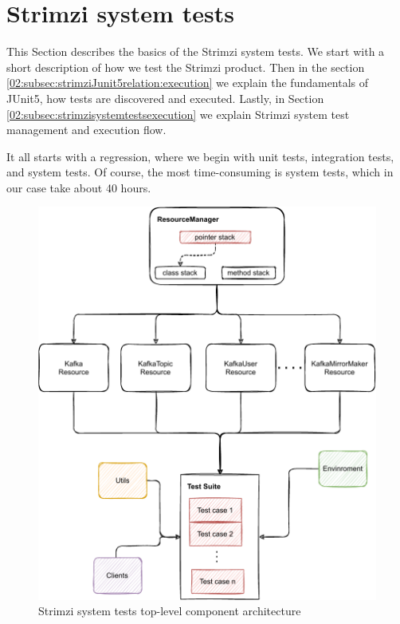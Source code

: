 \section{Strimzi system tests}
\label{02:sec:strimzisystemtests}

This Section describes the basics of the Strimzi system tests.
We start with a short description of how we test the Strimzi product.
Then in the section \ref{02:subsec:strimziJunit5relation:execution} we explain the fundamentals of JUnit5, how tests are discovered and executed. Lastly, in Section \ref{02:subsec:strimzisystemtestsexecution} we explain Strimzi system test management and execution flow. 

It all starts with a regression, where we begin with unit tests, integration tests, and system tests. Of course, the most time-consuming is system tests, which in our case take about 40 hours. 
\begin{figure}[!ht]
    \centering
    \includegraphics[scale=0.80]{obrazky-figures/02-preliminaries/04-strimzi-system-tests/01-architecture-overall.pdf}
    \caption{Strimzi system tests top-level component architecture}
    \label{02d:fig:strimzisystemtestarch}
\end{figure}
